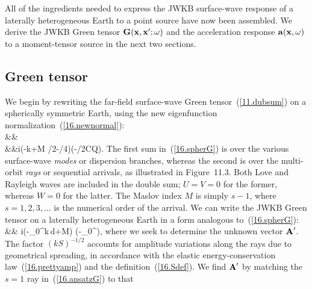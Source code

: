 All of the ingredients needed to express the JWKB
surface-wave response of a laterally heterogeneous
Earth to a point source have now been assembled.
We derive the JWKB Green tensor $\mbox{${\bf G}$}(\mbox{${\bf x}$},\mbox{${\bf x}$}';\mbox{$\omega$})$
and the acceleration response $\mbox{${\bf a}$}(\mbox{${\bf x}$},\mbox{$\omega$})$ to a
moment-tensor source in the next two sections.

\subsection{Green tensor}
%
%

We begin by rewriting the far-field surface-wave Green
tensor~(\ref{11.dubsum}) on a spherically symmetric Earth,
using the new eigenfunction normalization~(\ref{16.newnormal}):
\eqa \label{16.spherG}
 \\
&&\mbox{}  \nonumber \\
&&\mbox{}\qquad\times\exp i\left(-k\Delta+M
\pi/2-\pi/4\right)\exp(-\om\Delta/2CQ). \nonumber
\ena
The first sum in~(\ref{16.spherG}) is over the various
surface-wave {\em modes\/} or dispersion branches,
whereas the second is over the multi-orbit {\em rays\/}
or sequential arrivals, as illustrated in Figure~11.3.
Both Love and Rayleigh waves are included in the double
sum; $U=V=0$ for the former, whereas $W=0$ for the latter.
The Maslov index $M$ is simply $s-1$, where $s=1,2,3,\ldots$
is the numerical order of the arrival.  We can write the JWKB
Green tensor on a laterally heterogeneous Earth in a form
analogous to~(\ref{16.spherG}):
\eqa \label{16.ansatzG}
 \nonumber \\
&&\mbox{}\times
\exp i\left(-\int_0^\Delta k\,d\Delta+M\right)
\exp\left(-\om\int_0^\Delta{}\right),
\ena
where we seek to determine the unknown vector $\mbox{${\bf A}$}'$.
The factor $(kS)^{-1/2}$ accounts for amplitude variations
along the rays due to geometrical spreading, in accordance
with the elastic energy-conservation law~(\ref{16.prettyamp})
and the definition~(\ref{16.Sdef}).  We find $\mbox{${\bf A}$}'$ by
matching the $s=1$ ray in~(\ref{16.ansatzG}) to that
